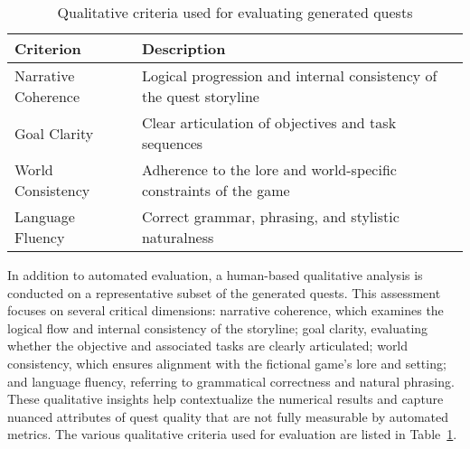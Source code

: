 \begin{table}[t]
  \centering
  \scriptsize
  \renewcommand{\arraystretch}{1.3}
  \begin{tabularx}{0.95\textwidth}{
    >{\raggedright\arraybackslash}p{5cm}
    >{\raggedright\arraybackslash}X
  }
    \toprule
    \textbf{Criterion} & \textbf{Description} \\
    \midrule
    Narrative Coherence & Logical progression and internal consistency of the quest storyline \\
    Goal Clarity & Clear articulation of objectives and task sequences \\
    World Consistency & Adherence to the lore and world-specific constraints of the game \\
    Language Fluency & Correct grammar, phrasing, and stylistic naturalness \\
    \bottomrule
  \end{tabularx}
  \caption{Qualitative criteria used for evaluating generated quests}
  \label{table:human-eval}
\end{table}

In addition to automated evaluation, a human-based qualitative analysis is conducted on
a representative subset of the generated quests. This assessment focuses on several critical
dimensions: narrative coherence, which examines the logical flow and internal consistency
of the storyline; goal clarity, evaluating whether the objective and associated tasks are
clearly articulated; world consistency, which ensures alignment with the fictional game's
lore and setting; and language fluency, referring to grammatical correctness and natural
phrasing. These qualitative insights help contextualize the numerical results and capture
nuanced attributes of quest quality that are not fully measurable by automated metrics.
The various qualitative criteria used for evaluation are listed in Table~\ref{table:human-eval}.

\newpage
